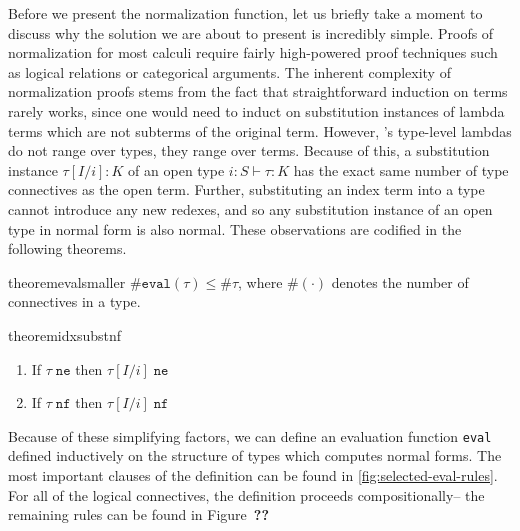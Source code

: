 Before we present the normalization function, let us briefly take a moment to discuss why the solution we are about to present is incredibly simple. Proofs of normalization for most calculi require fairly high-powered proof techniques such as logical relations or categorical arguments. The inherent complexity of normalization proofs stems from the fact that straightforward induction on terms rarely works, since one would need to induct on substitution instances of lambda terms which are not subterms of the original term. However, \dlambdaamor's type-level lambdas do not range over types, they range over terms. Because of this, a substitution instance $\tau[I/i] : K$ of an open type $i : S \vdash \tau : K$ has the exact same number of type connectives as the open term. Further, substituting an index term into a type cannot introduce any new redexes, and so any substitution instance of an open type in normal form is also normal. These observations are codified in the following theorems.

\begin{restatable}{theorem}{evalsmaller}
$\#\texttt{eval}(\tau) \leq \#\tau$, where $\#(\cdot)$ denotes the number of connectives in a type.
\end{restatable}


\begin{restatable}{theorem}{idxsubstnf}
\label{thm:idx-subst-nf}
~\begin{enumerate}
  \item If $\tau \; \texttt{ne}$ then $\tau[I/i] \; \texttt{ne}$
  \item If $\tau \; \texttt{nf}$ then $\tau[I/i] \; \texttt{nf}$
\end{enumerate}
\end{restatable}

Because of these simplifying factors, we can define an evaluation function \texttt{eval} defined inductively on the structure of types which computes normal forms.
The most important clauses of the definition can be found in \autoref{fig:selected-eval-rules}. For all of the logical connectives, the definition proceeds compositionally-- the remaining rules can be found in Figure~\textbf{??}

